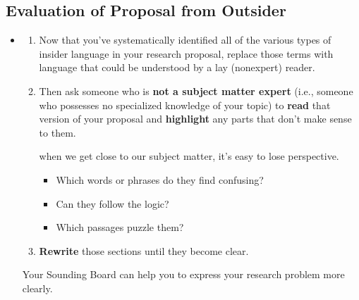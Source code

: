 \documentclass[11pt]{article}
\begin{document}
\subsection{Evaluation of Proposal from Outsider}
\begin{itemize}
\item \begin{exercise}
\begin{enumerate}
\item Now that you’ve systematically identified all of the various types of insider language in your research proposal,
replace those terms with language that could be understood by a lay (nonexpert) reader. 

\item Then ask someone who is \textbf{not a subject matter expert} (i.e., someone who possesses no specialized knowledge of your topic) to \textbf{read} that version of your proposal and \textbf{highlight} any parts that don’t make sense to them.

when we get close to our subject matter, it’s easy to lose perspective. 
\begin{itemize}
\item Which words or phrases do they find confusing? 
\item Can they follow the logic?
\item Which passages puzzle them? 
\end{itemize}
 
\item \textbf{Rewrite} those sections until they become clear. 
\end{enumerate}
Your Sounding Board can help you to express your research problem more clearly.
\end{exercise}
\end{itemize}
\end{document}
